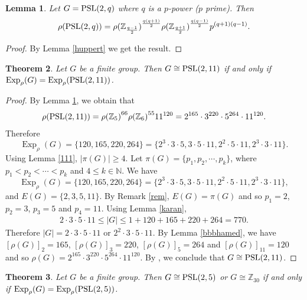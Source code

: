 \documentclass[12pt]{amsart}
\newtheorem{theorem}{Theorem}[section]
\newtheorem{lemma}[theorem]{Lemma}
\theoremstyle{definition}
\begin{document}
	\begin{lemma}\label{mohasebe}
	Let $ G = {\rm PSL}(2, q) $ where $ q $ is a $p$-power ($ p $ prime). Then
		$$\rho({\rm PSL}(2,q))={\rho(\mathbb{Z}_{\frac{q-1}{2}})}^{\frac{q(q+1)}{2}} {\rho(\mathbb{Z}_{\frac{q+1}{2}})}^{\frac{q(q-1)}{2}}  p^{(q+1)(q-1)}.$$
\end{lemma}

\begin{proof}
	By Lemma \ref{huppert}  we get the result.
\end{proof}
	\begin{theorem}
		Let $G$ be a finite group. Then
		$G \cong {\rm PSL}(2,11)$  if and only if 
		 $ {\operatorname{Exp}}_{\rho}(G) ={\operatorname{Exp}}_{\rho}({\rm PSL}(2,11))$.
	\end{theorem}
	\begin{proof}
	By Lemma \ref{mohasebe}, we obtain that
	\begin{align*}
	\rho({\rm PSL}(2,11))={\rho(\mathbb{Z}_{5})}^{66} {\rho(\mathbb{Z}_{6})}^{55}  11^{120}=2^{165}\cdot3^{220}\cdot5^{264}\cdot11^{120}.
	\end{align*}
Therefore $$ {\operatorname{Exp}}_{\rho}(G) =\{120, 165, 220, 264\}=\{2^3 \cdot  3\cdot 5, 3\cdot5\cdot11, 2^2\cdot5\cdot11, 2^3\cdot3\cdot11\}.$$
		Using Lemma  \ref{111}, $|\pi(G)|\geqslant 4$.
		Let $\pi(G)=\{{p_1}, {p_2}, \cdots, {p_k}\}$,
		where $p_1<p_2<\cdots<p_k$ and $4\leq k \in \mathbb{N}$.
We have
 $$ {\operatorname{Exp}}_{\rho}(G)=\{120, 165, 220, 264\}=\{2^3 \cdot 3 \cdot 5, 3 \cdot 5 \cdot 11,  2^2 \cdot 5 \cdot 11, 2^3 \cdot 3 \cdot 11\},$$
 and $E(G)=\{2, 3, 5, 11\}$.
By Remark \ref{rem}, $E(G)=\pi(G)$ and so
		$p_1=2$, $p_2=3$, $p_3=5$ and $p_4=11$.
			Using Lemma \ref{karan},
		\begin{align}\label{222}
			2 \cdot 3 \cdot 5 \cdot 11 \leq |G| \leq 1 + 120 + 165 + 220 + 264=770.
		\end{align}
		Therefore $|G|=2 \cdot 3 \cdot 5 \cdot 11$ or $2^2 \cdot 3 \cdot 5 \cdot 11$. 
 By Lemma \ref{bbbhamed},
		we have $[\rho(G)]_2=165$, $[\rho(G)]_3=220$, $[\rho(G)]_5=264$ and $[\rho(G)]_{11}=120$ and so
		$\rho(G) = 2^{165}\cdot3^{220}\cdot5^{264}\cdot11^{120}$.
		By \cite[Theorem 5]{baniMal}, we conclude  that $G \cong {\rm PSL}(2,11)$.
	\end{proof}
	\begin{theorem}
	Let $G$ be a finite group. Then
		$G \cong {\rm PSL}(2,5)$ or $G \cong \mathbb{Z}_{30}$  if and only if  ${\operatorname{Exp}}_{\rho}(G) = {\operatorname{Exp}}_{\rho}({\rm PSL}(2,5))$.
	\end{theorem}
\end{document}
